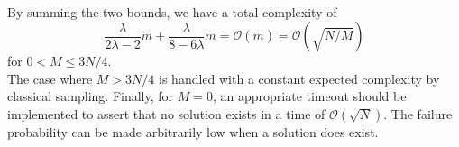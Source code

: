 \\
By summing the two bounds, we have a total complexity of
\[\frac{\lambda}{2\lambda-2}\tilde{m} + \frac{\lambda}{8-6\lambda}\tilde{m} = \mathcal{O}(\tilde{m}) = \mathcal{O}(\sqrt{N/M})\] for $0<M \leq 3N/4$.
\\
The case where $M > 3N/4$ is handled with a constant expected complexity by classical sampling. Finally, for $M = 0$, an appropriate timeout should be implemented to assert that no solution exists in a time of $\mathcal{O}(\sqrt{N})$. The failure probability can be made arbitrarily low when a solution does exist.